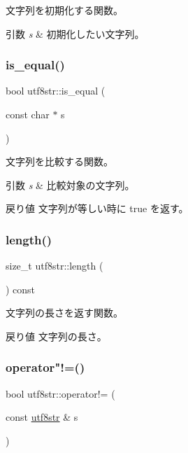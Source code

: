 文字列を初期化する関数。 
\begin{DoxyParams}{引数}
{\em s} & 初期化したい文字列。 \\
\hline
\end{DoxyParams}
\hypertarget{classutf8str_a34dc1b1052dcc2926c50dfb80d4ad812}{}\label{classutf8str_a34dc1b1052dcc2926c50dfb80d4ad812} 
\subsubsection{\texorpdfstring{is\+\_\+equal()}{is\_equal()}}
{\footnotesize\ttfamily bool utf8str\+::is\+\_\+equal (\begin{DoxyParamCaption}\item[{const char $\ast$}]{s }\end{DoxyParamCaption})}

文字列を比較する関数。 
\begin{DoxyParams}{引数}
{\em s} & 比較対象の文字列。 \\
\hline
\end{DoxyParams}
\begin{DoxyReturn}{戻り値}
文字列が等しい時に true を返す。 
\end{DoxyReturn}
\hypertarget{classutf8str_a3b489cf2af0d19ad973b307c3df750c9}{}\label{classutf8str_a3b489cf2af0d19ad973b307c3df750c9} 
\subsubsection{\texorpdfstring{length()}{length()}}
{\footnotesize\ttfamily size\+\_\+t utf8str\+::length (\begin{DoxyParamCaption}{ }\end{DoxyParamCaption}) const}

文字列の長さを返す関数。 \begin{DoxyReturn}{戻り値}
文字列の長さ。 
\end{DoxyReturn}
\hypertarget{classutf8str_a0cf4339625674316856ae65e34ed06e0}{}\label{classutf8str_a0cf4339625674316856ae65e34ed06e0} 
\subsubsection{\texorpdfstring{operator"!=()}{operator!=()}\hspace{0.1cm}{\footnotesize\ttfamily [1/2]}}
{\footnotesize\ttfamily bool utf8str\+::operator!= (\begin{DoxyParamCaption}\item[{const \hyperlink{classutf8str}{utf8str} \&}]{s }\end{DoxyParamCaption})}

